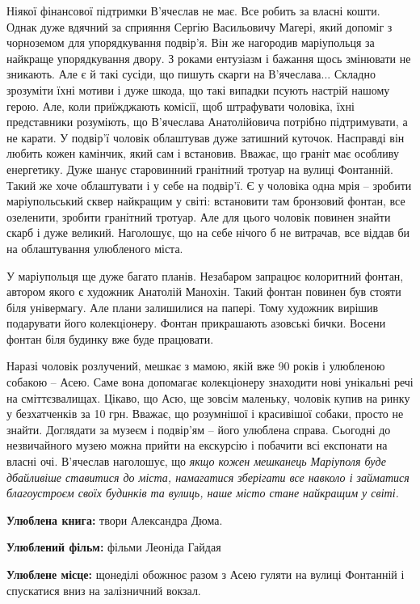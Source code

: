 Ніякої фінансової підтримки  В'ячеслав не має. Все робить за власні кошти.
Однак дуже вдячний за сприяння Сергію Васильовичу Магері, який допоміг з
чорноземом для упорядкування подвір'я. Він же нагородив маріупольця за найкраще
упорядкування двору. З роками ентузіазм і бажання щось змінювати не зникають.
Але є й такі сусіди, що пишуть скарги на В'ячеслава... Складно зрозуміти їхні
мотиви і дуже шкода, що такі випадки псують настрій нашому герою. Але, коли
приїжджають комісії, щоб штрафувати чоловіка, їхні представники розуміють, що
В'ячеслава Анатолійовича потрібно підтримувати, а не карати. У подвір'ї чоловік
облаштував дуже затишний куточок. Насправді він любить кожен камінчик, який сам
і встановив. Вважає, що граніт має особливу енергетику. Дуже шанує старовинний
гранітний тротуар на вулиці Фонтанній. Такий же хоче облаштувати і у себе на
подвір'ї.  Є  у чоловіка одна мрія – зробити маріупольський сквер найкращим у
світі: встановити там бронзовий фонтан, все озеленити, зробити гранітний
тротуар. Але для цього чоловік повинен знайти скарб і дуже великий. Наголошує,
що на себе нічого б не витрачав, все віддав би на облаштування улюбленого
міста.

У маріупольця ще дуже багато планів. Незабаром запрацює колоритний фонтан,
автором якого є художник Анатолій Манохін. Такий фонтан повинен був стояти біля
універмагу. Але плани залишилися на папері. Тому художник вирішив подарувати
його колекціонеру. Фонтан прикрашають азовські бички. Восени фонтан біля
будинку вже буде працювати.

Наразі чоловік розлучений, мешкає з мамою, якій вже 90 років і улюбленою
собакою – Асею. Саме вона допомагає колекціонеру знаходити нові унікальні речі
на сміттєзвалищах. Цікаво, що Асю, ще зовсім маленьку, чоловік купив на ринку у
безхатченків за 10 грн. Вважає, що розумнішої і красивішої собаки, просто не
знайти. Доглядати за музеєм і подвір'ям – його улюблена справа. Сьогодні до
незвичайного музею можна прийти на екскурсію і побачити всі експонати на власні
очі. В'ячеслав наголошує, що \emph{якщо кожен мешканець Маріуполя буде дбайливіше
ставитися до міста, намагатися зберігати все навколо і займатися благоустроєм
своїх будинків та вулиць, наше місто стане найкращим у світі.}

\textbf{Улюблена книга:} твори Александра Дюма.

\textbf{Улюблений фільм:} фільми Леоніда Гайдая

\textbf{Улюблене місце:} щонеділі обожнює разом з Асею гуляти на вулиці
Фонтанній і спускатися вниз на залізничний вокзал.
